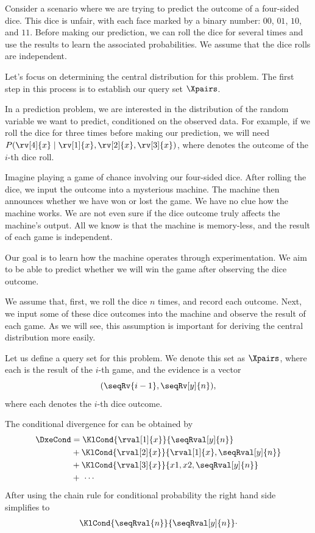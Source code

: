 Consider a scenario where we are trying to predict the outcome of a four-sided dice. This dice is unfair, with each
face marked by a binary number: $00$, $01$, $10$, and $11$.
Before making our prediction, we can roll the dice for several times and use the results to learn the associated
probabilities.
We assume that the dice rolls are independent.

Let's focus on determining the central distribution for this problem.
The first step in this process is to establish our query set $\Xpairs$.

In a prediction problem, we are interested in the distribution of the random variable we want to predict,
conditioned on the observed data.
For example, if we roll the dice for three times before making our prediction,
we will need $P(\rv[4]{x} \mid \rv[1]{x},\rv[2]{x},\rv[3]{x})$, where \Qvar denotes the outcome
of the $i$-th dice roll.

Imagine playing a game of chance involving our four-sided dice.
After rolling the dice, we input the outcome into a mysterious machine.
The machine then announces whether we have won or lost the game.
We have no clue how the machine works. We are not even sure if the dice outcome truly affects the machine’s output.
All we know is that the machine is memory-less, and the result of each game is independent.

Our goal is to learn how the machine operates through experimentation.
We aim to be able to predict whether we will win the game after observing the dice outcome.

We assume that, first, we roll the dice $n$ times, and record each outcome.
Next, we input some of these dice outcomes into the machine and observe the result of each game.
As we will see, this assumption is important for deriving the central distribution more easily.

Let us define a query set for this problem.
We denote this set as $\Xpairs$, where each \Qvar is the result of the $i$-th game, and the evidence  is a
vector
\[
    (\seqRv{i-1}, \seqRv[y]{n}),
\]
where each  denotes the $i$-th dice outcome.

The conditional divergence for  can be obtained by
\begin{align*}
    \DxeCond &= \KlCond{\rval[1]{x}}{\seqRval[y]{n}} \\
    &+ \KlCond{\rval[2]{x}}{\rval[1]{x},\seqRval[y]{n}} \\
    &+ \KlCond{\rval[3]{x}}{x1, x2, \seqRval[y]{n}} \\
    &+ \ \cdots \\
\end{align*}
After using the chain rule for conditional probability the right hand side simplifies to
\begin{align*}
    \KlCond{\seqRval{n}}{\seqRval[y]{n}} \cdot
\end{align*}

